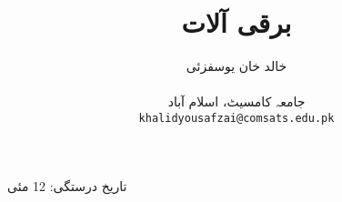 \documentclass[leqno,b5paper]{book}
\author{
خالد خان یوسفزئی\\
\\
{\small {جامعہ کامسیٹ، اسلام آباد}}\\
\texttt{khalidyousafzai@comsats.edu.pk}
}
\title{برقی آلات}
\date{}                           %
\begin{document}
\begin{urdufont}

\renewcommand*{\contentsname}{عنوان}    %

\frontmatter                          %

\maketitle
\newpage
تاریخ درستگی: 12 مئی 

\tableofcontents
\pagestyle{empty}



\mainmatter                      %
\renewcommand*{\chaptername}{باب}

\pagestyle{headings}












\backmatter

\renewcommand*{\indexname}{فرہنگ}      %
\cleardoublepage
{}
\printindex

\end{urdufont}
\end{document}
